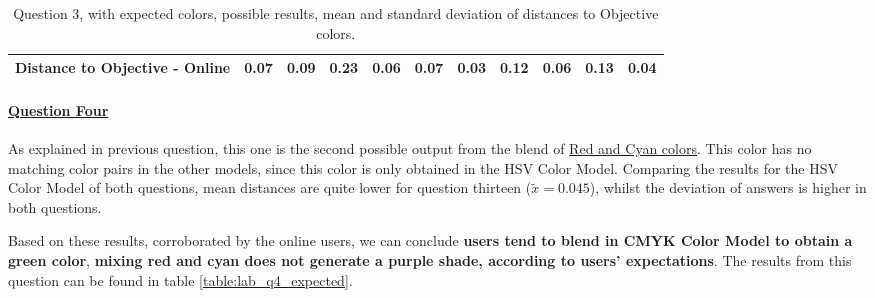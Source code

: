 \begin{table}[H]
{\begin{tabular}{lccccccccccccc}
    \multicolumn{4}{l}{Distance to Objective - Online}                                                                                               & \multicolumn{1}{|c}{\textbf{0.07}}        & \multicolumn{1}{c|}{0.09}    & \multicolumn{1}{|c}{0.23}        & \multicolumn{1}{c|}{0.06}    & \multicolumn{1}{|c}{\textbf{0.07}}       & \multicolumn{1}{c|}{0.03}    & \multicolumn{1}{|c}{0.12}        & \multicolumn{1}{c|}{0.06}    & \multicolumn{1}{|c}{0.13}       & \multicolumn{1}{c|}{0.04}    \\ \hline
    \end{tabular}}
  \caption[Question 3, with expected Results.]{Question 3, with expected colors, possible results, mean and standard deviation of distances to Objective colors.}
  \label{table:lab_q3_expected}
\end{table}
%
\paragraph{\ul{Question Four}}
%
As explained in previous question, this one is the second possible output from the blend of \ul{Red and Cyan colors}. This color has no matching color pairs in the other models,
since this color is only obtained in the HSV Color Model. Comparing the results for the HSV Color Model of both questions, mean distances are quite lower for question thirteen
($\tilde{x} = 0.045$), whilst the deviation of answers is higher in both questions. \par
%
Based on these results, corroborated by the online users, we can conclude \textbf{users tend to blend in CMYK Color Model to obtain a green color}, \textbf{mixing red and cyan
does not generate a purple shade, according to users' expectations}. The results from this question can be found in table \ref{table:lab_q4_expected}.
%
